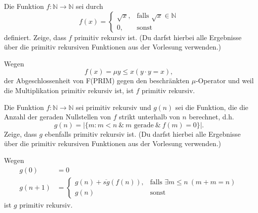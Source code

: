 \documentclass[german,headsepline]{scrartcl}
\theoremstyle{definition}
\begin{document}
	\begin{question}[subtitle={Klausur 2009}]
		Die Funktion $f:\mathbb{N}\to\mathbb{N}$ sei durch
		\[f(x)=\begin{cases}
			\sqrt{x}, &\text{falls }\sqrt{x}\in\mathbb{N} \\
			0, &\text{sonst}
		\end{cases}\]
		definiert. Zeige, dass $f$ primitiv rekursiv ist.
		(Du darfst hierbei alle Ergebnisse über die primitiv rekursiven Funktionen aus der Vorlesung verwenden.)
	\end{question}
	\begin{solution}
		Wegen
		\[f(x)=\mu y\leq x(y\cdot y=x),\]
		der Abgeschlossenheit von F(PRIM) gegen den beschränkten $\mu$-Operator
		und weil die Multiplikation primitiv rekursiv ist,
		ist $f$ primitiv rekursiv.
	\end{solution}
	
	\begin{question}[subtitle={Klausur 2009}]
		Die Funktion $f:\mathbb{N}\to\mathbb{N}$ sei primitiv rekursiv und $g(n)$ sei die Funktion,
		die die Anzahl der geraden Nullstellen von $f$ strikt unterhalb von $n$ berechnet, d.h.
		\[g(n)=\vert\{m\colon m<n~\&~m\text{ gerade}~\&~f(m)=0\}\vert.\]
		Zeige, dass $g$ ebenfalls primitiv rekursiv ist.
		(Du darfst hierbei alle Ergebnisse über die primitiv rekursiven Funktionen aus der Vorlesung verwenden.)
	\end{question}
	\begin{solution}
		Wegen
		\begin{align*}
			g(0) &= 0 \\
			g(n+1) &= \begin{cases}
				g(n)+\overline{sg}(f(n)), &\text{falls }\exists m\leq n~(m+m=n) \\
				g(n) &\text{sonst}
			\end{cases}
		\end{align*}
		ist $g$ primitiv rekursiv.
	\end{solution}
	
\end{document}

